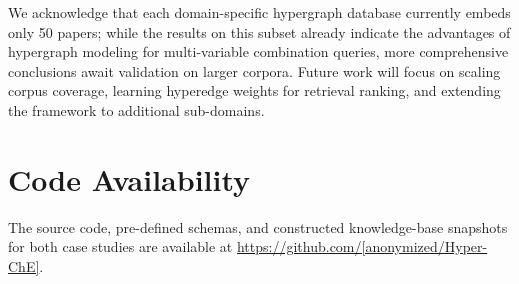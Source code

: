 We acknowledge that each domain-specific hypergraph database currently embeds only 50 papers; while the results on this subset already indicate the advantages of hypergraph modeling for multi-variable combination queries, more comprehensive conclusions await validation on larger corpora. Future work will focus on scaling corpus coverage, learning hyperedge weights for retrieval ranking, and extending the framework to additional sub-domains.

\section*{Code Availability}
\label{sec:code}

The source code, pre-defined schemas, and constructed knowledge-base snapshots for both case studies are available at \url{https://github.com/[anonymized/Hyper-ChE]}.
